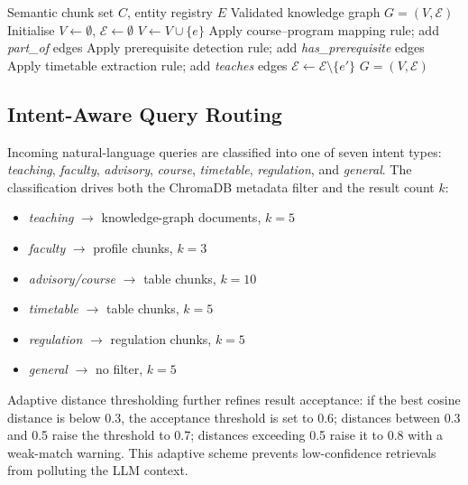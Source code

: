 \documentclass{ieeeaccess}
\begin{document}
\begin{algorithm}[!t]
\caption{Knowledge Graph Construction}
\label{alg:kg}
\begin{algorithmic}[1]
\REQUIRE Semantic chunk set $C$, entity registry $E$
\ENSURE Validated knowledge graph $G = (V, \mathcal{E})$
\STATE Initialise $V \leftarrow \emptyset$, $\mathcal{E} \leftarrow \emptyset$
    \STATE $V \leftarrow V \cup \{e\}$
\ENDFOR
{}
    \STATE Apply course--program mapping rule; add \textit{part\_of} edges
    \STATE Apply prerequisite detection rule; add \textit{has\_prerequisite} edges
    \STATE Apply timetable extraction rule; add \textit{teaches} edges
\ENDFOR
{}
        \STATE $\mathcal{E} \leftarrow \mathcal{E} \setminus \{e'\}$
    \ENDIF
\ENDFOR
\RETURN $G = (V, \mathcal{E})$
\end{algorithmic}
\end{algorithm}

\subsection{Intent-Aware Query Routing}
Incoming natural-language queries are classified into one of seven intent types: \textit{teaching}, \textit{faculty}, \textit{advisory}, \textit{course}, \textit{timetable}, \textit{regulation}, and \textit{general}. The classification drives both the ChromaDB metadata filter and the result count $k$:

\begin{itemize}
    \item \textit{teaching} $\rightarrow$ knowledge-graph documents, $k{=}5$
    \item \textit{faculty} $\rightarrow$ profile chunks, $k{=}3$
    \item \textit{advisory/course} $\rightarrow$ table chunks, $k{=}10$
    \item \textit{timetable} $\rightarrow$ table chunks, $k{=}5$
    \item \textit{regulation} $\rightarrow$ regulation chunks, $k{=}5$
    \item \textit{general} $\rightarrow$ no filter, $k{=}5$
\end{itemize}

Adaptive distance thresholding further refines result acceptance: if the best cosine distance is below 0.3, the acceptance threshold is set to 0.6; distances between 0.3 and 0.5 raise the threshold to 0.7; distances exceeding 0.5 raise it to 0.8 with a weak-match warning. This adaptive scheme prevents low-confidence retrievals from polluting the LLM context.
\end{document}
